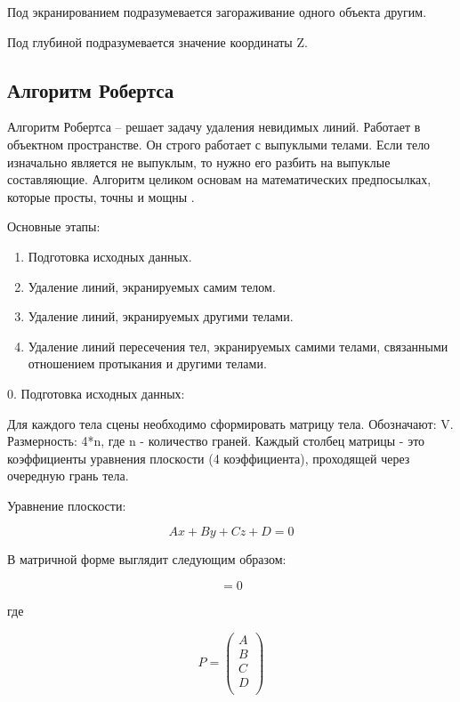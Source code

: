 Под экранированием подразумевается загораживание одного объекта другим.

Под глубиной подразумевается значение координаты Z.

\subsection{Алгоритм Робертса}

Алгоритм Робертса -- решает задачу удаления невидимых линий. Работает в объектном пространстве. Он строго работает с выпуклыми телами. Если тело изначально является не выпуклым, то нужно его разбить на выпуклые составляющие. Алгоритм целиком основам на математических предпосылках, которые просты, точны и мощны .

Основные этапы:
\begin{enumerate}
	\item Подготовка исходных данных.
	\item Удаление линий, экранируемых самим телом.
	\item Удаление линий, экранируемых другими телами.
	\item Удаление линий пересечения тел, экранируемых самими телами, связанными отношением протыкания и другими телами.
\end{enumerate}

0. Подготовка исходных данных:

Для каждого тела сцены необходимо сформировать матрицу тела. Обозначают: V. Размерность: 4*n, где n - количество граней. Каждый столбец матрицы - это коэффициенты уравнения плоскости (4 коэффициента), проходящей через очередную грань тела.

Уравнение плоскости:

\begin{equation}
	Ax + By + Cz + D = 0
\end{equation}

В матричной форме выглядит следующим образом:

\begin{equation}
[x\;y\;z\;1][P] = 0
\end{equation} 

где 

\begin{equation}
P = \left(
\begin{array}{c}
A \\
B \\
C \\
D \\
\end{array}
\right)
\end{equation}

